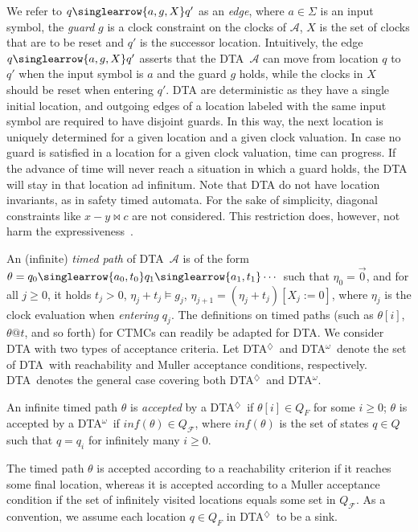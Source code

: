 \documentclass{LMCS}
\newcommand{\mc}[1]{\mathcal{#1}}
\newcommand{\<}{\langle}
\renewcommand{\>}{\rangle}
\newcommand{\ges}{\geqslant}
\newcommand{\mF}{\mathcal{F}}
\newcommand{\DTA}{\textsc{DTA}}
\newcommand{\DTAr}{\DTA$^{\!\Ever}$}
\newcommand{\DTAo}{\DTA$^{\omega}$}
\newcommand{\mv}[1]{\singlearrow{#1}}
\newcommand{\F}{\mathop{\diamondsuit}}
\newcommand{\Ever}{\F}
\begin{document}
We refer to $q\mv{a,g,X}q'$ as an \emph{edge}, where $a\in \Sigma$ is an input symbol,
the \emph{guard} $g$ is a clock constraint on the clocks of $\mc{A}$, $X$ is the set of
clocks that are to be reset and $q'$ is the successor location.
Intuitively, the edge $q\mv{a,g,X}q'$ asserts that the \DTA\ $\mc{A}$ can move from
location $q$ to $q'$ when the input symbol is $a$ and the guard $g$ holds, while the
clocks in $X$ should be reset when entering $q'$.
DTA are deterministic as they have a single initial location, and outgoing edges of a
location labeled with the same input symbol are required to have disjoint guards.
In this way, the next location is uniquely determined for a given location and a given
clock valuation.
In case no guard is satisfied in a location for a given clock valuation, time can progress.
If the advance of time will never reach a situation in which a guard holds, the DTA will
stay in that location ad infinitum.
Note that DTA do not have location invariants, as in safety timed automata.
For the sake of simplicity, diagonal constraints like $x-y\bowtie c$ are not considered.
This restriction does, however, not harm the expressiveness~\cite{BPDG98}.

An (infinite) \emph{timed path} of \DTA\ $\mc{A}$ is of the form $\theta = q_0 \mv{a_0,
t_0} q_1\mv{a_1, t_1}\cdots$ such that $\eta_0 = \vec{0}$, and for all $j \ges 0$, it holds
$t_j > 0$, $\eta_j{+}t_j \models g_j$, $\eta_{j+1}=(\eta_j{+}t_j)[X_j:=0]$, where $\eta_j$
is the clock evaluation when \emph{entering} $q_j$.
The definitions on timed paths (such as $\theta[i]$, $\theta@t$, and so forth) for CTMCs
can readily be adapted for DTA.
We consider DTA with two types of acceptance criteria.
Let \DTAr\ and \DTAo\ denote the set of \DTA\ with reachability and Muller acceptance
conditions, respectively.
\DTA\ denotes the general case covering both \DTAr\ and \DTAo.

\begin{defi}
An infinite timed path $\theta$ is \emph{accepted} by a \DTAr\ if $\theta[i] \in Q_F$ for
some $i\ges 0$; ${\theta}$ is accepted by a \DTAo\ if ${in\!f}({\theta})\in Q_\mF$, where $in\!f({\theta})$ is the set of states $q \in Q$ such that $q=q_i$ for infinitely many $i \ges
0$.
\end{defi}

The timed path $\theta$ is accepted according to a reachability criterion if it reaches
some final location, whereas it is accepted according to a Muller acceptance condition
if the set of infinitely visited locations equals some  set in $Q_\mF$.
As a convention, we assume each location $q \in Q_F$ in \DTAr\ to be a sink.
\end{document}

